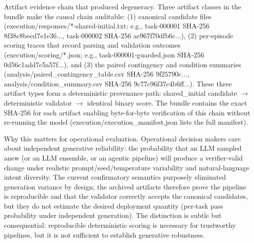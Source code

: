 \documentclass[conference]{IEEEtran}
\begin{document}
Artifact evidence chain that produced degeneracy. Three artifact classes in the bundle make the causal chain auditable: (1) canonical candidate files (execution/responses/*-shared-initial.txt; e.g., task‑000001 SHA‑256 8f38c8becd7e1e36..., task‑000002 SHA‑256 ae967f70dfb6c...), (2) per‑episode scoring traces that record parsing and validation outcomes (execution/scoring/*.json; e.g., task‑000001‑guarded.json SHA‑256 0d56c1add7c5a57f...), and (3) the paired contingency and condition summaries (analysis/paired\_contingency\_table.csv SHA‑256 9f25790c..., analysis/condition\_summary.csv SHA‑256 9c77c96f37c4b6ff...). These three artifact types form a deterministic provenance path: shared\_initial candidate \ensuremath{\rightarrow} deterministic validator \ensuremath{\rightarrow} identical binary score. The bundle contains the exact SHA‑256 for each artifact enabling byte‑for‑byte verification of this chain without re‑running the model (execution/execution\_manifest.json lists the full manifest).

Why this matters for operational evaluation. Operational decision makers care about independent generative reliability: the probability that an LLM sampled anew (or an LLM ensemble, or an agentic pipeline) will produce a verifier‑valid change under realistic prompt/seed/temperature variability and natural‑language intent diversity. The current confirmatory semantics purposely eliminated generation variance by design; the archived artifacts therefore prove the pipeline is reproducible and that the validator correctly accepts the canonical candidates, but they do not estimate the desired deployment quantity (per‑task pass probability under independent generation). The distinction is subtle but consequential: reproducible deterministic scoring is necessary for trustworthy pipelines, but it is not sufficient to establish generative robustness.
\end{document}

